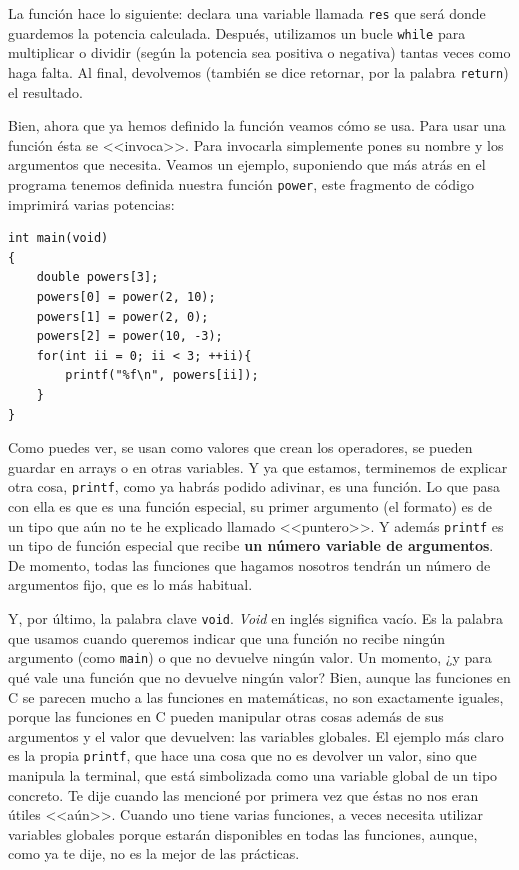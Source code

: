 \documentclass[a4paper]{article}
\begin{document}
La función hace lo siguiente: declara una variable llamada \verb!res! que será
donde guardemos la potencia calculada. Después, utilizamos un bucle \verb!while!
para multiplicar o dividir (según la potencia sea positiva o negativa) tantas
veces como haga falta. Al final, devolvemos (también se dice retornar, por la
palabra \verb!return!) el resultado.

Bien, ahora que ya hemos definido la función veamos cómo se usa. Para usar una
función ésta se <<invoca>>. Para invocarla simplemente pones su nombre y los
argumentos que necesita. Veamos un ejemplo, suponiendo que más atrás en el
programa tenemos definida nuestra función \verb!power!,
este fragmento de código imprimirá varias potencias:


\noindent
\begin{minipage}[H]{\linewidth}
\mbox{}
\begin{lstlisting}[style=C, label={lst:functionInvocation},
caption={Invocación de función en C}]
int main(void)
{
    double powers[3];
    powers[0] = power(2, 10);
    powers[1] = power(2, 0);
    powers[2] = power(10, -3);
    for(int ii = 0; ii < 3; ++ii){
        printf("%f\n", powers[ii]);
    }
}
\end{lstlisting}
\end{minipage}


Como puedes ver, se usan como valores que crean los operadores,
se pueden guardar en arrays o en otras
variables. Y ya que estamos, terminemos de explicar otra cosa, \verb!printf!,
como ya habrás podido adivinar, es una función. Lo que pasa con ella es que
es una función especial, su primer argumento (el formato) es de un tipo que
aún no te he explicado llamado <<puntero>>. Y además \verb!printf! es un
tipo de función especial que recibe \textbf{un número variable de argumentos}.
De momento, todas las funciones que hagamos nosotros tendrán un número de
argumentos fijo, que es lo más habitual.

Y, por último, la palabra clave \lstinline[style=C]{void}. \textit{Void} en
inglés significa vacío. Es la palabra que usamos cuando queremos indicar que
una función no recibe ningún argumento (como \verb!main!) o que no devuelve
ningún valor. Un momento, ¿y para qué vale una función que no devuelve ningún
valor? Bien, aunque las funciones en C se parecen mucho a las funciones en
matemáticas, no son exactamente iguales, porque las funciones en C pueden
manipular otras cosas además de sus argumentos y el valor que devuelven:
las variables globales.
El ejemplo más claro es la propia \verb!printf!, que hace una cosa que no es
devolver un valor, sino que manipula la terminal, que está simbolizada como una
variable global de un tipo concreto. Te dije cuando las mencioné por primera vez
que éstas no nos eran útiles <<aún>>. Cuando uno tiene varias funciones, a veces
necesita utilizar variables globales porque estarán disponibles en todas las
funciones, aunque, como ya te dije, no es la mejor de las prácticas.
\end{document}
